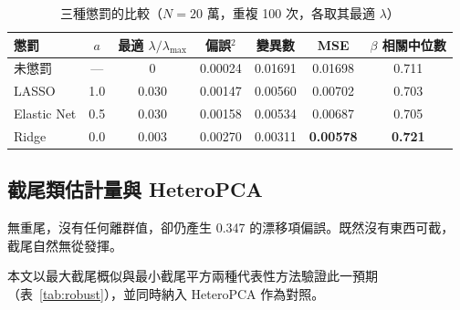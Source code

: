 \documentclass[UTF8, fontset=macnew, a4paper, 12pt]{ctexart}
\begin{document}
\begin{table}[H]
\centering
\caption{三種懲罰的比較（$N=20$ 萬，重複 100 次，各取其最適 $\lambda$）}
\small
\begin{tabular}{lcccccc}
\toprule
懲罰 & $a$ & 最適 $\lambda/\lambda_{\max}$ & 偏誤$^2$ & 變異數 & MSE & $\beta$ 相關中位數\\
\midrule
未懲罰 & --- & 0 & 0.00024 & 0.01691 & 0.01698 & 0.711\\
LASSO & 1.0 & 0.030 & 0.00147 & 0.00560 & 0.00702 & 0.703\\
Elastic Net & 0.5 & 0.030 & 0.00158 & 0.00534 & 0.00687 & 0.705\\
Ridge & 0.0 & 0.003 & 0.00270 & 0.00311 & \textbf{0.00578} & \textbf{0.721}\\
\bottomrule
\end{tabular}
\label{tab:pen}
\end{table}

\subsection{截尾類估計量與 HeteroPCA}

無重尾，沒有任何離群值，卻仍產生 0.347 的漂移項偏誤。既然沒有東西可截，
截尾自然無從發揮。

本文以最大截尾概似與最小截尾平方兩種代表性方法驗證此一預期
（表~\ref{tab:robust}），並同時納入 HeteroPCA 作為對照。
\end{document}

